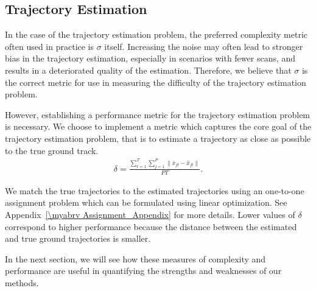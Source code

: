 \subsection{Trajectory Estimation}
In the case of the trajectory estimation problem, the preferred complexity metric often used in practice is $\sigma$ itself. Increasing the noise may often lead to stronger bias in the trajectory estimation, especially in scenarios with fewer scans, and results in a deteriorated quality of the estimation. Therefore, we believe that $\sigma$ is the correct metric for use in measuring the difficulty of the trajectory estimation problem. 

However, establishing a performance metric for the trajectory estimation problem is necessary. We choose to implement a metric which captures the core goal of the trajectory estimation problem, that is to estimate a trajectory as close as possible to the true ground track. 
\begin{align*}
	\delta = \frac{\sum\limits_{t=1}^{T}\sum\limits_{j=1}^{P}\| \bar{x}_{jt} - \hat{x}_{jt} \|}{PT}.
\end{align*}

We match the true trajectories to the estimated trajectories using an one-to-one assignment problem which can be formulated using linear optimization. See Appendix~\ref{\myabrv Assignment_Appendix} for more details. Lower values of $\delta$ correspond to higher performance because the distance between the estimated and true ground trajectories is smaller. 

In the next section, we will see how these measures of complexity and performance are useful in quantifying the strengths and weaknesses of our methods.
